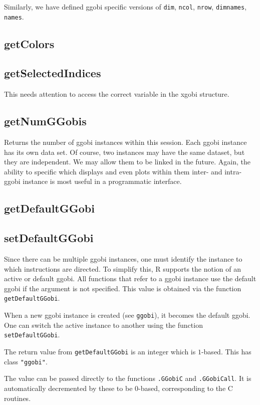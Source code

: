 \documentclass{article}
\def\SFunction#1{{\texttt{\red #1}}}
\begin{document}
Similarly, we have defined ggobi specific
versions of \SFunction{dim}, \SFunction{ncol},
\SFunction{nrow}, \SFunction{dimnames},
\SFunction{names}.


\subsection{getColors}


\subsection{getSelectedIndices}
This needs attention to access the correct
variable in the xgobi structure.


\subsection{getNumGGobis}
Returns the number of ggobi instances within this session.  Each ggobi
instance has its own data set. Of course, two instances may have the
same dataset, but they are independent.  We may allow them to be
linked in the future.  Again, the ability to specific which displays
and even plots within them inter- and intra- ggobi instance is most
useful in a programmatic interface.

\subsection{getDefaultGGobi}
\subsection{setDefaultGGobi}
Since there can be multiple ggobi instances, one must identify the
instance to which instructions are directed.  To simplify this, R
supports the notion of an active or default ggobi.  All functions that
refer to a ggobi instance use the default ggobi if the 
argument is not specified.  This value is obtained via the function
\SFunction{getDefaultGGobi}.

When a new ggobi instance is created (see \SFunction{ggobi}), it
becomes the default ggobi.  One can switch the active instance to
another using the function \SFunction{setDefaultGGobi}.

The return value from \SFunction{getDefaultGGobi} is an integer which
is $1$-based.  This has class \texttt{"ggobi"}.

The value can be passed directly to the functions \SFunction{.GGobiC}
and \SFunction{.GGobiCall}.  It is automatically decremented by these
to be $0$-based, corresponding to the C routines.
\end{document}
